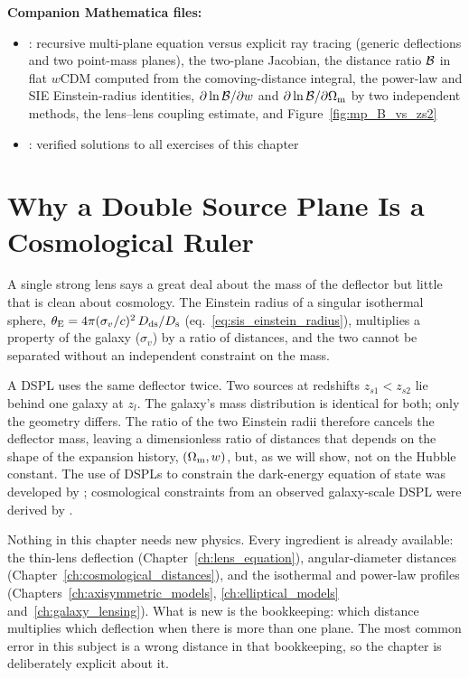 \medskip
\noindent
\textbf{Companion Mathematica files:}
\begin{itemize}[nosep]
    \item {}:
          recursive multi-plane equation versus explicit ray tracing
          (generic deflections and two point-mass planes), the two-plane
          Jacobian, the distance ratio $\mathcal{B}$ in flat $w$CDM computed
          from the comoving-distance integral, the power-law and SIE
          Einstein-radius identities, $\partial\ln\mathcal{B}/\partial w$ and
          $\partial\ln\mathcal{B}/\partial\Omega_{\mathrm{m}}$ by two independent methods,
          the lens--lens coupling estimate, and
          Figure~\ref{fig:mp_B_vs_zs2}
    \item {}:
          verified solutions to all exercises of this chapter
\end{itemize}


\section{Why a Double Source Plane Is a Cosmological Ruler}
\label{sec:mp_why}

A single strong lens says a great deal about the mass of the
deflector but little that is clean about cosmology.  The Einstein
radius of a singular isothermal sphere,
$\theta_{\mathrm{E}} = 4\pi(\sigma_v/c)^2\,D_{\mathrm{ds}}/D_{\mathrm{s}}$
(eq.~\eqref{eq:sis_einstein_radius}), multiplies a property of the galaxy
($\sigma_v$) by a ratio of distances, and the two cannot be separated
without an independent constraint on the mass.

A DSPL uses the same deflector twice.  Two sources at redshifts
$z_{s1}<z_{s2}$ lie behind one galaxy at $z_l$.  The galaxy's mass
distribution is identical for both; only the geometry differs.  The
ratio of the two Einstein radii therefore cancels the deflector mass,
leaving a dimensionless ratio of distances that depends on the shape of
the expansion history, $(\Omega_{\mathrm{m}},w)$, but, as we will show, not on the
Hubble constant.  The use of DSPLs to constrain the
dark-energy equation of state was developed by \citet{collett_2012};
cosmological constraints from an observed galaxy-scale DSPL were derived
by \citet{collett_auger_2014}.

\begin{annotation}
Nothing in this chapter needs new physics.  Every ingredient is
already available: the thin-lens deflection
(Chapter~\ref{ch:lens_equation}), angular-diameter distances
(Chapter~\ref{ch:cosmological_distances}), and the isothermal and
power-law profiles (Chapters~\ref{ch:axisymmetric_models},
\ref{ch:elliptical_models} and~\ref{ch:galaxy_lensing}).  What is new is
the bookkeeping: which distance multiplies which deflection when
there is more than one plane.  The most common error in this subject is
a wrong distance in that bookkeeping, so the chapter is deliberately
explicit about it.
\end{annotation}


